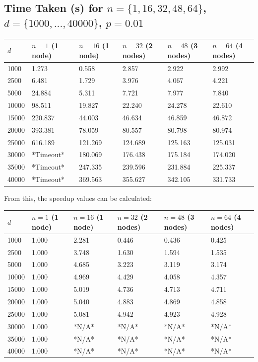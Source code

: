 \documentclass[11pt]{article}
\begin{document}
\begin{appendices}
\newpage
{\color{darkindigo}
\subsection{Time Taken (s) for $n=\{1,16,32,48,64\}$, $d=\{1000,...,40000\}$, $p=0.01$}
\footnotesize{\label{apdx:dimtime}}
\color{black}
\begin{center}
\begin{tabular}{|l|l|l|l|l|l|}
\hline
$d$ & $n=1$ (1 node) & $n=16$ (1 node) & $n=32$ (2 nodes) & $n=48$ (3 nodes) & $n=64$ (4 nodes)\\
\hline
1000 & 1.273 & 0.558 & 2.857 & 2.922 & 2.992\\
2500 & 6.481 & 1.729 & 3.976 & 4.067 & 4.221\\
5000 & 24.884 & 5.311 & 7.721 & 7.977 & 7.840\\
10000 & 98.511 & 19.827 & 22.240 & 24.278 & 22.610\\
15000 & 220.837 & 44.003 & 46.634 & 46.859 & 46.872\\
20000 & 393.381 & 78.059 & 80.557 & 80.798 & 80.974\\
25000 & 616.189 & 121.269 & 124.689 & 125.163 & 125.031\\
30000 & *Timeout* & 180.069 & 176.438 & 175.184 & 174.020\\
35000 & *Timeout* & 247.335 & 239.596 & 231.884 & 225.337\\
40000 & *Timeout* & 369.563 & 355.627 & 342.105 & 331.733\\
\hline
\end{tabular}
\end{center}}

{\normalsize From this, the speedup values can be calculated:}
\footnotesize{
\begin{center}
\begin{tabular}{|l|l|l|l|l|l|}
\hline
$d$ & $n=1$ (1 node) & $n=16$ (1 node) & $n=32$ (2 nodes) & $n=48$ (3 nodes) & $n=64$ (4 nodes)\\
\hline
1000 & 1.000 & 2.281 & 0.446 & 0.436 & 0.425\\
2500 & 1.000 & 3.748 & 1.630 & 1.594 & 1.535\\
5000 & 1.000 & 4.685 & 3.223 & 3.119 & 3.174\\
10000 & 1.000 & 4.969 & 4.429 & 4.058 & 4.357\\
15000 & 1.000 & 5.019 & 4.736 & 4.713 & 4.711\\
20000 & 1.000 & 5.040 & 4.883 & 4.869 & 4.858\\
25000 & 1.000 & 5.081 & 4.942 & 4.923 & 4.928\\
30000 & 1.000 & *N/A* & *N/A* & *N/A* & *N/A*\\ 
35000 & 1.000 & *N/A* & *N/A* & *N/A* & *N/A*\\ 
40000 & 1.000 & *N/A* & *N/A* & *N/A* & *N/A*\\ 
\hline
\end{tabular}
\end{center}
}


\end{appendices}
\end{document}
